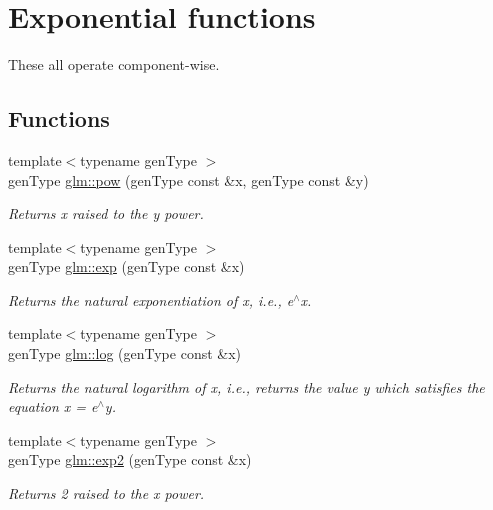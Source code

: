 \hypertarget{group__core__func__exponential}{\section{Exponential functions}
\label{group__core__func__exponential}
}


These all operate component-\/wise.  


\subsection*{Functions}
\begin{DoxyCompactItemize}
\item 
{\footnotesize template$<$typename gen\-Type $>$ }\\gen\-Type \hyperlink{group__core__func__exponential_gac93ea301c287d87a63fa14a4c44b719b}{glm\-::pow} (gen\-Type const \&x, gen\-Type const \&y)
\begin{DoxyCompactList}\small\item\em Returns x raised to the y power. \end{DoxyCompactList}\item 
{\footnotesize template$<$typename gen\-Type $>$ }\\gen\-Type \hyperlink{group__core__func__exponential_ga03903bb9395a13d554a5fbecdf67792b}{glm\-::exp} (gen\-Type const \&x)
\begin{DoxyCompactList}\small\item\em Returns the natural exponentiation of x, i.\-e., e$^\wedge$x. \end{DoxyCompactList}\item 
{\footnotesize template$<$typename gen\-Type $>$ }\\gen\-Type \hyperlink{group__core__func__exponential_ga46a307f466090551e328eec42abf61bc}{glm\-::log} (gen\-Type const \&x)
\begin{DoxyCompactList}\small\item\em Returns the natural logarithm of x, i.\-e., returns the value y which satisfies the equation x = e$^\wedge$y. \end{DoxyCompactList}\item 
{\footnotesize template$<$typename gen\-Type $>$ }\\gen\-Type \hyperlink{group__core__func__exponential_ga18385688b951da01cdc3a22c232e4e28}{glm\-::exp2} (gen\-Type const \&x)
\begin{DoxyCompactList}\small\item\em Returns 2 raised to the x power. \end{DoxyCompactList}\item 

\end{DoxyCompactItemize}
